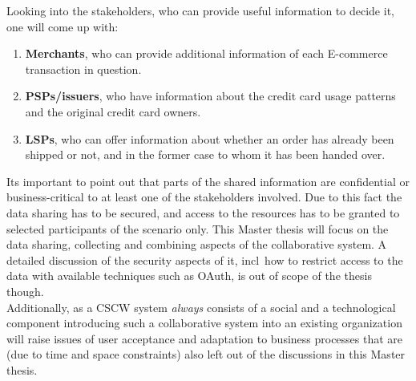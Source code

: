 Looking into the stakeholders, who can provide useful information to decide it, one will come up with:\@

\begin{enumerate}
    \item \textbf{Merchants}, who can provide additional information of each \gls{E-commerce} transaction in question.
    \item \textbf{\gls{PSP}s/issuers}, who have information about the credit card usage patterns and the original credit card owners.
    \item \textbf{\gls{LSP}s}, who can offer information about whether an order has already been shipped or not, and in the former case to whom it has been handed over.
\end{enumerate}

Its important to point out that parts of the shared information are confidential or business-critical to at least one of the stakeholders involved. Due to this fact the data sharing has to be secured, and access to the resources has to be granted to selected participants of the scenario only. This Master thesis will focus on the data sharing, collecting and combining aspects of the collaborative system. A detailed discussion of the security aspects of it, \gls{incl}\ how to restrict access to the data with available techniques such as \gls{OAuth}, is out of scope of the thesis though.\\

Additionally, as a \gls{CSCW} system \emph{always} consists of a social and a technological component introducing such a collaborative system into an existing organization will raise issues of user acceptance and adaptation to business processes that are (due to time and space constraints) also left out of the discussions in this Master thesis.

